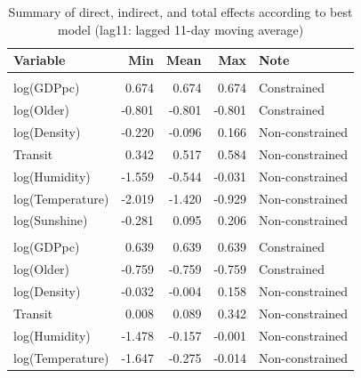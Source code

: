\documentclass[]{elsarticle} %
\begin{document}
\begin{table}

\caption{\label{tab:summary-impacts-best-model}\label{tab:summary-impacts-best-model}Summary of direct, indirect, and total effects according to best model (lag11: lagged 11-day moving average)}
\centering
\begin{tabular}[t]{lrrrl}
\toprule
Variable & Min & Mean & Max & Note\\
\midrule
\rowcolor{gray!6}  \addlinespace[0.3em]
\multicolumn{5}{l}{\textbf{Direct Effects}}\\
\hspace{1em}log(GDPpc) & 0.674 & 0.674 & 0.674 & Constrained\\
\hspace{1em}log(Older) & -0.801 & -0.801 & -0.801 & Constrained\\
\rowcolor{gray!6}  \hspace{1em}log(Density) & -0.220 & -0.096 & 0.166 & Non-constrained\\
\hspace{1em}Transit & 0.342 & 0.517 & 0.584 & Non-constrained\\
\rowcolor{gray!6}  \hspace{1em}log(Humidity) & -1.559 & -0.544 & -0.031 & Non-constrained\\
\hspace{1em}log(Temperature) & -2.019 & -1.420 & -0.929 & Non-constrained\\
\rowcolor{gray!6}  \hspace{1em}log(Sunshine) & -0.281 & 0.095 & 0.206 & Non-constrained\\
\addlinespace[0.3em]
\multicolumn{5}{l}{\textbf{Indirect Effects}}\\
\hspace{1em}log(GDPpc) & 0.639 & 0.639 & 0.639 & Constrained\\
\rowcolor{gray!6}  \hspace{1em}log(Older) & -0.759 & -0.759 & -0.759 & Constrained\\
\hspace{1em}log(Density) & -0.032 & -0.004 & 0.158 & Non-constrained\\
\rowcolor{gray!6}  \hspace{1em}Transit & 0.008 & 0.089 & 0.342 & Non-constrained\\
\hspace{1em}log(Humidity) & -1.478 & -0.157 & -0.001 & Non-constrained\\
\rowcolor{gray!6}  \hspace{1em}log(Temperature) & -1.647 & -0.275 & -0.014 & Non-constrained\\

\end{tabular}
\end{table}
\end{document}
